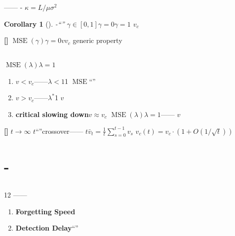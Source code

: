 \documentclass[11pt,a4paper]{article}
\newtheorem{corollary}[theorem]{Corollary}
\theoremstyle{remark}
\DeclareMathOperator{\MSE}{MSE}
\newcommand{\heuristic}{\textnormal{\textbf{[]}}}
\newcommand{\conjecture}{\textnormal{\textbf{[]}}}
\begin{document}
\textbf{}——
-
$\kappa = L/\mu$$\sigma^2$

\begin{corollary}[]\label{cor:universality}
-``''
$\gamma \in [0, 1]$$\gamma = 0$$\gamma = 1$
$v_c$

\end{corollary}

\conjecture{} \textbf{}
$\MSE(\gamma)$$\gamma=0$$v$$v_c$
generic property


\subsection{}

$\MSE(\lambda)$$\lambda=1$


\begin{enumerate}[label=(\arabic*)]
    \item \textbf{$v < v_c$}——$\lambda < 1$1
          $\MSE$``''\textbf{}
    \item \textbf{$v > v_c$}——$\lambda^*$1
          $v$
    \item \textbf{critical slowing down}$v \approx v_c$
          $\MSE(\lambda)$$\lambda=1$——
          $v$
\end{enumerate}

\heuristic{} \textbf{}$t \to \infty$
$t$``''crossover——
$t$$\bar{v}_t = \frac{1}{t}\sum_{s=0}^{t-1} v_s$
$v_c(t) = v_c \cdot (1 + O(1/\sqrt{t}))$

\section{-}

\subsection{}

\textbf{}1\textbf{}2
——

\begin{enumerate}[label=(\arabic*)]
    \item \textbf{Forgetting Speed}
          
    \item \textbf{Detection Delay}``''
          
\end{enumerate}
\end{document}
